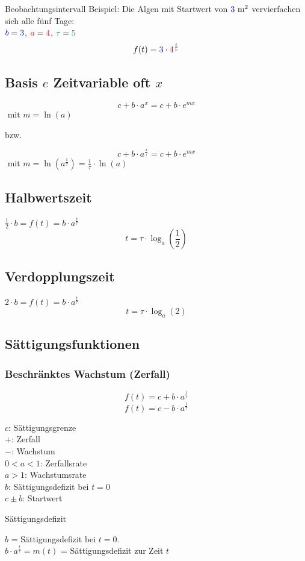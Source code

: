 \begin{multicols}{2}
\begin{rezept*}{Beobachtungsintervall}{}
Beispiel: Die Algen mit Startwert von ${\color{blue}3} \textrm{ m}^2$ ver{\color{red}vier}fachen
sich alle {\color{ForestGreen}fünf} Tage:\\
${\color{blue}b}={\color{blue}3}$, ${\color{red}a}={\color{red}4}$, ${\color{ForestGreen}\tau}={\color{ForestGreen}5}$
$$f(t)= {\color{blue}3}\cdot{}{\color{red}4}^\frac{t}{\color{ForestGreen}5}$$
\end{rezept*}


\subsection*{Basis $e$ Zeitvariable oft $x$}

$$c+b\cdot{}a^x = c + b\cdot{}e^{mx}$$ $\textrm{ mit } m = \ln(a)$

bzw.

$$c+b\cdot{}a^\frac{x}\tau = c+b\cdot{}e^{mx}$$ $\textrm{ mit }
m=\ln\left(a^\frac1\tau\right) = \frac1\tau \cdot{}\ln(a)$

\subsection*{Halbwertszeit}
$\frac12 \cdot{} b = f(t) = b\cdot{}a^{\frac{t}{\tau}}$
$$t= \tau\cdot{}\log_a\left(\frac12\right)$$

\subsection*{Verdopplungszeit}
$2\cdot{}b = f(t) = b\cdot{}a^{\frac{t}{\tau}}$
$$t = \tau\cdot{}\log_a(2)$$

\subsection*{Sättigungsfunktionen}



\subsubsection*{Beschränktes Wachstum (Zerfall)}

$$f(t) = c + b\cdot{}a^\frac{t}\tau$$
$$f(t) = c - b\cdot{}a^\frac{t}\tau$$

$c$: Sättigungsgrenze\\
$+$: Zerfall\\
$-$: Wachstum\\
$0<a<1$: Zerfallsrate\\
$a>1$: Wachstumsrate\\
$b$: Sättigungsdefizit bei $t=0$\\
$c \pm b$: Startwert 



\begin{bemerkung*}{Sättigungsdefizit}{}

$b$ = Sättigungsdefizit bei $t=0$.\\
$b\cdot{}a^\frac{t}\tau = m(t)$ = Sättigungsdefizit zur Zeit $t$
\end{bemerkung*}

\end{multicols}

